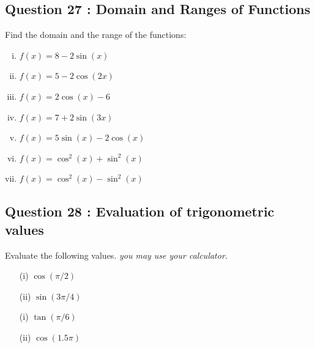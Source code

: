 \documentclass[]{article}
\begin{document}
		\subsection*{Question 27 : Domain and Ranges of Functions}
			Find the domain and the range of the functions:
\begin{multicols}{2}
		\begin{enumerate}[(i)]
		\item $f(x) = 8 - 2 \sin(x)$ 	

		\item $f(x) = 5 - 2 \cos(2x)$ 
			\item $f(x) =  2 \cos(x)- 6$ 

		\item $f(x) = 7 + 2 \sin(3x)$ 
		
		\item $f(x) = 5\sin(x) - 2 \cos(x)$ 
				
		\item $f(x) = \cos^2(x) +  \sin^2(x)$ 
				\item $f(x) = \cos^2(x) -  \sin^2(x)$ 
	\end{enumerate}	
\end{multicols}		
		\smallskip
	\subsection*{Question 28 : Evaluation of trigonometric values}
	Evaluate the following values. \textit{you may use your calculator.}
	\begin{multicols}{2}
		\begin{itemize}
			\item[(i)] $\cos (\pi/2)$
			\item[(ii)] $\sin (3\pi/4)$
			
			\item[(i)] $\tan (\pi/6)$
			\item[(ii)] $\cos (1.5 \pi)$
		\end{itemize} 
	\end{multicols}
	\bigskip	


\newpage
\end{document}
